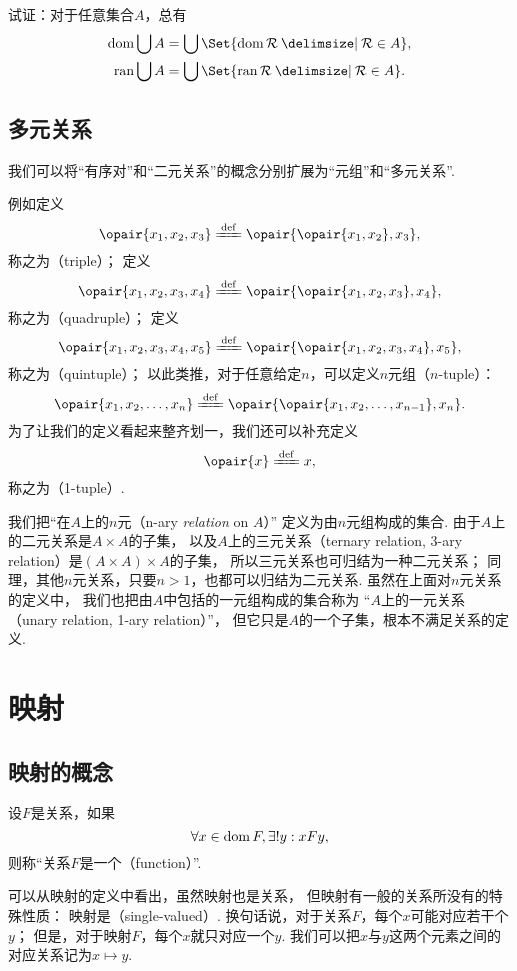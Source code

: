 \begin{example}
试证：对于任意集合\(A\)，总有\begin{gather}
	\dom\bigcup A = \bigcup\Set{ \dom\rel{R} \given \rel{R} \in A }, \\
	\ran\bigcup A = \bigcup\Set{ \ran\rel{R} \given \rel{R} \in A }.
\end{gather}
\end{example}

\subsection{多元关系}
我们可以将“有序对”和“二元关系”的概念分别扩展为“元组”和“多元关系”.

例如定义\[
	\opair{x_1,x_2,x_3}
	\defeq
	\opair{\opair{x_1,x_2},x_3},
\]
称之为（triple）；
定义\[
	\opair{x_1,x_2,x_3,x_4}
	\defeq
	\opair{\opair{x_1,x_2,x_3},x_4},
\]
称之为（quadruple）；
定义\[
	\opair{x_1,x_2,x_3,x_4,x_5}
	\defeq
	\opair{\opair{x_1,x_2,x_3,x_4},x_5},
\]
称之为（quintuple）；
以此类推，对于任意给定\(n\)，可以定义\(n\)元组（\(n\)-tuple）：\[
	\opair{x_1,x_2,\dotsc,x_n}
	\defeq
	\opair{\opair{x_1,x_2,\dotsc,x_{n-1}},x_n}.
\]
为了让我们的定义看起来整齐划一，我们还可以补充定义\[
	\opair{x} \defeq x,
\]
称之为（1-tuple）.

我们把“在\(A\)上的\(n\)元（n-ary \emph{relation} on \(A\)）”%
定义为由\(n\)元组构成的集合.
由于\(A\)上的二元关系是\(A \times A\)的子集，
以及\(A\)上的三元关系（ternary relation, 3-ary relation）是\((A \times A) \times A\)的子集，
所以三元关系也可归结为一种二元关系；
同理，其他\(n\)元关系，只要\(n>1\)，也都可以归结为二元关系.
虽然在上面对\(n\)元关系的定义中，
我们也把由\(A\)中包括的一元组构成的集合称为%
“\(A\)上的一元关系（unary relation, 1-ary relation）”，
但它只是\(A\)的一个子集，根本不满足关系的定义.

\section{映射}
\subsection{映射的概念}
\begin{definition}
设\(F\)是关系，如果\[
	\forall x \in \operatorname{dom} F, \exists! y:
	x F y,
\]
则称“关系\(F\)是一个（function）”.
\end{definition}
可以从映射的定义中看出，虽然映射也是关系，
但映射有一般的关系所没有的特殊性质：
映射是（single-valued）.
换句话说，对于关系\(F\)，每个\(x\)可能对应若干个\(y\)；
但是，对于映射\(F\)，每个\(x\)就只对应一个\(y\).
我们可以把\(x\)与\(y\)这两个元素之间的对应关系记为\(x \mapsto y\).


